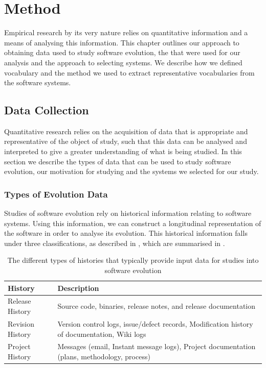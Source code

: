 \chapter{Method}
\label{cha:method}

Empirical research by its very nature relies on quantitative information and a means of analysing this information. This chapter outlines our approach to obtaining data used to study software evolution, the {\OSYS} that were used for our analysis and the approach to selecting systems. We describe how we defined vocabulary and the method we used to extract representative vocabularies from the software systems.

\section{Data Collection} %
\label{sec:data_collection}

Quantitative research relies on the acquisition of data that is appropriate and representative of the object of study, such that this data can be analysed and interpreted to give a greater understanding of what is being studied. In this section we describe the types of data that can be used to study software evolution, our motivation for studying {\OSYS} and the systems we selected for our study.

\subsection{Types of Evolution Data} %
\label{sub:types_of_evolution_data}

Studies of software evolution rely on historical information relating to software systems. Using this information, we can construct a longitudinal representation of the software in order to analyse its evolution. This historical information falls under three classifications, as described in \cite{Vasa10a}, which are summarised in .

\begin{table}[t]
\centering
\begin{tabular}{|p{}|p{}|}
\hline
{\bf History} & {\bf Description}\\
\hline \hline
Release History & Source code, binaries, release notes, and release documentation\\
\hline
Revision History & Version control logs, issue/defect records, Modification history of documentation, Wiki logs\\
\hline
Project History & Messages (email, Instant message logs), Project documentation (plans, methodology, process)\\
\hline
\end{tabular}
\vspace{0.2cm}
\caption{The different types of histories that typically provide input data for studies into software evolution}
\label{tab:histories}
\vspace{-0.2cm}
\end{table}

